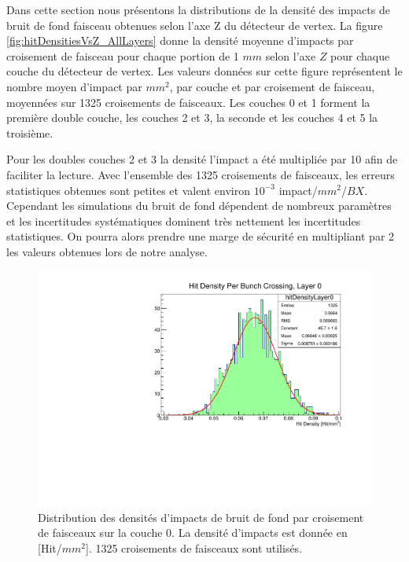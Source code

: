  Dans cette section nous pr\'esentons la distributions de la densit\'e des impacts de bruit de fond faisceau obtenues selon l'axe Z du d\'etecteur de vertex. La figure \ref{fig:hitDensitiesVsZ_AllLayers} donne la densit\'e moyenne d'impacts par croisement de faisceau pour chaque portion de 1 $mm$ selon l'axe $Z$ pour chaque couche du d\'etecteur de vertex. Les valeurs donn\'ees sur cette figure repr\'esentent le nombre moyen d'impact par $mm^2$, par couche et par croisement de faisceau, moyenn\'ees sur 1325 croisements de faisceaux. Les couches 0 et 1 forment la premi\`ere double couche, les couches 2 et 3, la seconde et les couches 4 et 5 la troisi\`eme.
 
 \medskip
 
 Pour les doubles couches 2 et 3 la densit\'e l'impact a \'et\'e multipli\'ee par 10 afin de faciliter la lecture. Avec l'ensemble des 1325 croisements de faisceaux, les erreurs statistiques obtenues sont petites et valent environ $10^{-3}$ impact/$mm^2$/$BX$. Cependant les simulations du bruit de fond d\'ependent de nombreux param\`etres et les incertitudes syst\'ematiques dominent tr\`es nettement les incertitudes statistiques. On pourra alors prendre une marge de s\'ecurit\'e en multipliant par 2 les valeurs obtenues lors de notre analyse.

  \begin{figure}[!htb]
    \begin{center}
      \includegraphics[scale=0.60]{./figures/Beamstrahlung/HitDensityPerBunchCrossingPerMm2_Layer0.pdf}
      \caption{Distribution des densit\'es d'impacts de bruit de fond par croisement de faisceaux sur la couche 0. La densit\'e d'impacts est donn\'ee en [Hit/$mm^2$]. 1325 croisements de faisceaux sont utilis\'es.}
      \label{fig:hitDensitiesPerBXs_Layer0}
    \end{center}
  \end{figure}
 
